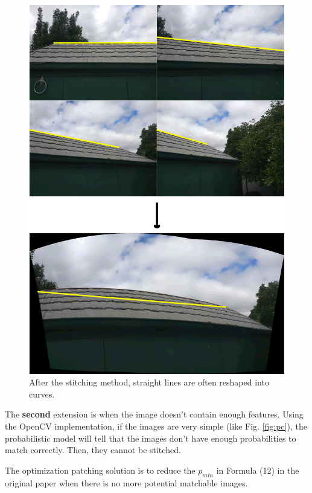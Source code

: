 \documentclass[10pt,twocolumn,letterpaper]{article}
\begin{document}
\begin{figure}[t]
    \begin{center}
        \includegraphics[width=0.9\linewidth]{line_combine}
    \end{center}
    \caption{After the stitching method, straight lines are often reshaped into curves.}
    \label{fig:cml}
\end{figure}

The \textbf{second} extension is when the image doesn't contain enough features.
Using the OpenCV implementation, if the images are very simple (like Fig. \ref{fig:pc}),
the probabilistic model will tell that the images don't have enough probabilities to match correctly.
Then, they cannot be stitched.

The optimization patching solution is to reduce the $p_{min}$ in Formula (12) in the original paper when there is no more potential matchable images.
\end{document}
